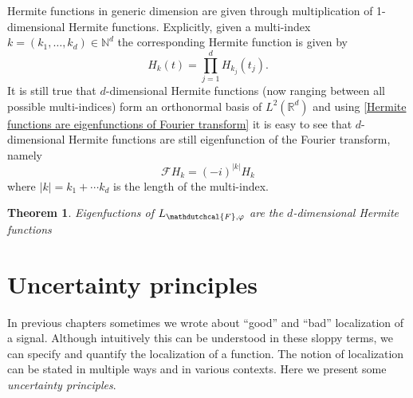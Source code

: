 \documentclass[corpo=11pt, stile=classica, tipotesi=custom,
greek, evenboxes, english]{toptesi}
\numberwithin{equation}{chapter}
\newtheorem{teo}{Theorem}[chapter] %
\newcommand{\R}{\mathbb{R}} %
\newcommand{\N}{\mathbb{N}} %
\newcommand{\F}{\mathscr{F}} %
\begin{document}
Hermite functions in generic dimension are given through multiplication of 1-dimensional Hermite functions. Explicitly, given a multi-index $k = (k_1,\ldots,k_d) \in \N^d$ the corresponding Hermite function is given by
\begin{equation}\label{Hermite function d-dimensional}
	H_k(t) = \prod_{j=1}^d H_{k_j}(t_j).
\end{equation}
It is still true that $d$-dimensional Hermite functions (now ranging between all possible multi-indices) form an orthonormal basis of $L^2(\R^d)$ and using \eqref{Hermite functions are eigenfunctions of Fourier transform} it is easy to see that $d$-dimensional Hermite functions are still eigenfunction of the Fourier transform, namely
\begin{equation}\label{d-dimensional Hermite functions are eigenfunctions of Fourier transform}
	\F H_k = (-i)^{|k|}H_k
\end{equation}
where $|k|=k_1 + \cdots k_d$ is the length of the multi-index.
\begin{teo}\label{eigenvalues and eigenvectors localization operator spherically symmetric weight}
	Eigenfuctions of $L_{\mathdutchcal{F},\varphi}$ are the $d$-dimensional Hermite functions
\end{teo}



\chapter{Uncertainty principles}\label{chapter uncertainty principles}
In previous chapters sometimes we wrote about ``good'' and ``bad'' localization of a signal. Although intuitively this can be understood in these sloppy terms, we can specify and quantify the localization of a function. The notion of localization can be stated in multiple ways and in various contexts. {\color{blue} Here we present some \emph{uncertainty principles}.}
\end{document}
